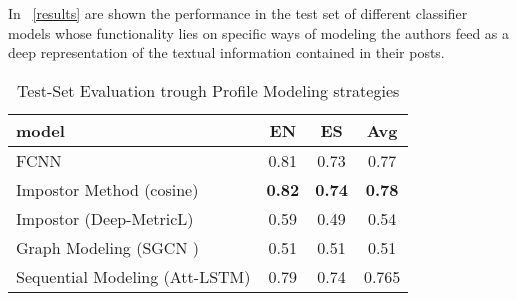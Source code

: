 \documentclass{llncs}
\begin{document}
In \tablename~\ref{results} are shown the performance in the test set of different classifier models whose functionality lies on specific ways of modeling the authors feed as a deep representation of the textual information contained in their posts.
	\begin{table}[!thb]
		\begin{center}
		\begin{tabular}{lccc}
			\hline
			model&EN&ES&Avg\\
			\hline
			FCNN&0.81&0.73&0.77\\
			Impostor Method (cosine)&\textbf{0.82}&\textbf{0.74}&\textbf{0.78}\\
			Impostor (Deep-MetricL)&0.59&0.49&0.54\\
			Graph Modeling (SGCN )&0.51&0.51&0.51\\
			Sequential Modeling (Att-LSTM) &0.79&0.74&0.765\\
			\hline
		\end{tabular}
		\end{center}
		\label{results}
		\caption{Test-Set Evaluation trough Profile Modeling strategies}\label{ensb}
	\end{table}   
\end{document}
